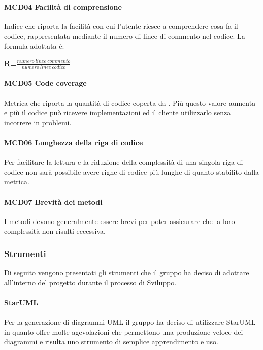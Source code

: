 \paragraph{MCD04 Facilità di comprensione}
Indice che riporta la facilità con cui l'utente riesce a comprendere cosa fa il codice, rappresentata mediante il numero di linee di commento nel codice.
La formula adottata è:\newline
\centerline{\textbf{R=$\frac{numero\ linee\ commento}{numero\ linee\ codice}$}}
\paragraph{MCD05 Code coverage}
Metrica che riporta la quantità di codice coperta da . Più questo valore aumenta e più il codice può ricevere implementazioni ed il cliente utilizzarlo senza incorrere in problemi.
\paragraph{MCD06 Lunghezza della riga di codice}
Per facilitare la lettura e la riduzione della complessità di una singola riga di codice non sarà possibile avere righe di codice più lunghe di quanto stabilito dalla metrica.
\paragraph{MCD07 Brevità dei metodi}
I metodi devono generalmente essere brevi per poter assicurare che la loro complessità non risulti eccessiva.

\subsubsection{Strumenti}
Di seguito vengono presentati gli strumenti che il gruppo ha deciso di adottare all'interno del progetto durante il processo di Sviluppo.
\paragraph{StarUML}
Per la generazione di diagrammi UML il gruppo ha deciso di utilizzare StarUML in quanto offre molte agevolazioni che permettono una produzione veloce dei diagrammi e risulta uno strumento di semplice apprendimento e uso.